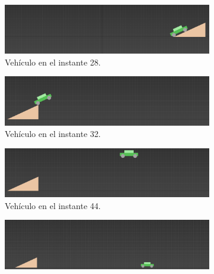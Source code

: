\documentclass{article}
\begin{document}
\begin{figure}[H]
    \hfill
    \begin{subfigure}[H]{0.48\textwidth}
        \centering
        \includegraphics[width=\textwidth]{imagenes/Ejercicio2/keyframes/28.png}
        \caption{Vehículo en el instante 28.}
    \end{subfigure}
    \par\bigskip
    \begin{subfigure}[H]{0.48\textwidth}
        \centering
        \includegraphics[width=\textwidth]{imagenes/Ejercicio2/keyframes/32.png}
        \caption{Vehículo en el instante 32.}
    \end{subfigure}
    \hfill
    \begin{subfigure}[H]{0.48\textwidth}
        \centering
        \includegraphics[width=\textwidth]{imagenes/Ejercicio2/keyframes/44.png}
        \caption{Vehículo en el instante 44.}
    \end{subfigure}
    \par\bigskip
    \begin{subfigure}[H]{0.48\textwidth}
        \centering
        \includegraphics[width=\textwidth]{imagenes/Ejercicio2/keyframes/56.png}

\end{subfigure}
\end{figure}
\end{document}
